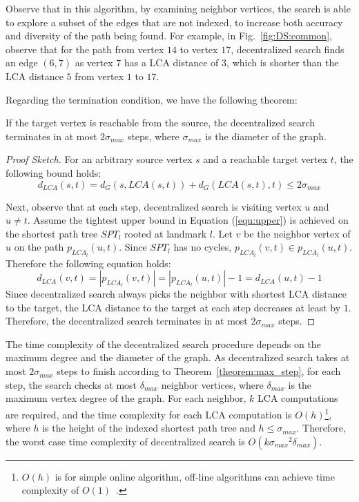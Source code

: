 Observe that in this algorithm, by examining neighbor vertices, the search is able to explore a subset of the edges that are not indexed, to increase both accuracy and diversity of the path being found. For example, in Fig.~\ref{fig:DS:common}, observe that for the path from vertex $14$ to vertex $17$, decentralized search finds an edge $(6, 7)$ as vertex $7$ has a LCA distance of $3$, which is shorter than the LCA distance $5$ from vertex $1$ to $17$.

Regarding the termination condition, we have the following theorem:

\begin{theorem}
\label{theorem:max_step}
If the target vertex is reachable from the source, the decentralized search terminates in at most $2{\sigma}_{max}$ steps, where ${\sigma}_{max}$ is the diameter of the graph.
\end{theorem}
\begin{proof}[Proof Sketch]
For an arbitrary source vertex $s$ and a reachable target vertex $t$, the following bound holds:
\[
    d_{LCA}(s,t) = d_G(s,LCA(s,t)) + d_G(LCA(s,t),t) \leq 2{\sigma}_{max}
\]

Next, observe that at each step, decentralized search is visiting vertex $u$ and $u \neq t$. Assume the tightest upper bound in Equation (\ref{equ:upper}) is achieved on the shortest path tree $SPT_l$ rooted at landmark $l$. Let $v$ be the neighbor vertex of $u$ on the path $p_{LCA_l}(u,t)$. Since $SPT_l$ has no cycles, $p_{LCA_l}(v,t) \in p_{LCA_l}(u,t)$. Therefore the following equation holds:
\[
		d_{LCA}(v,t) = |p_{LCA_l}(v,t)| = |p_{LCA_l}(u,t)| - 1 = d_{LCA}(u,t) - 1
\]
Since decentralized search always picks the neighbor with shortest LCA distance to the target, the LCA distance to the target at each step decreases at least by $1$. Therefore, the decentralized search terminates in at most $2{\sigma}_{max}$ steps.
\end{proof}

The time complexity of the decentralized search procedure depends on the maximum degree and the diameter of the graph. As decentralized search takes at most $2{\sigma}_{max}$ steps to finish according to Theorem~\ref{theorem:max_step}, for each step, the search checks at most ${\delta}_{max}$ neighbor vertices, where ${\delta}_{max}$ is the maximum vertex degree of the graph. For each neighbor, $k$ LCA computations are required, and the time complexity for each LCA computation is $O(h)$\footnote{$O(h)$ is for simple online algorithm, off-line algorithms can achieve time complexity of $O(1)$~\cite{bender2000lca}.}, where $h$ is the height of the indexed shortest path tree and $h \leq {\sigma}_{max}$. Therefore, the worst case time complexity of decentralized search is $O(k{{\sigma}_{max}}^2{\delta}_{max})$. 

